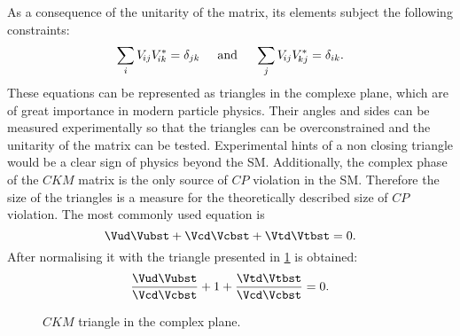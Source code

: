 As a consequence of the unitarity of the matrix, its elements subject the following constraints:
\begin{equation}
\sum_{i} V_{{\kern -0.1em}ij}V_{{\kern -0.1em}ik}^{*} = \delta_{jk}\hspace{0.5cm}\text{and}\hspace{0.5cm}
\sum_{j} V_{{\kern -0.1em}ij}V_{{\kern -0.1em}kj}^{*} = \delta_{ik}.
\end{equation}
These equations can be represented as triangles in the complexe plane, which are of great importance in modern particle physics.
Their angles and sides can be measured experimentally so that the triangles can be overconstrained and the unitarity of the matrix can be tested.
Experimental hints of a non closing triangle would be a clear sign of physics beyond the \ac{SM}.
Additionally, the complex phase of the $CKM$ matrix is the only source of $CP$ violation in the \ac{SM}.
Therefore the size of the triangles is a measure for the theoretically described size of $CP$ violation.
The most commonly used equation is
\begin{equation}
\Vud\Vubst + \Vcd\Vcbst + \Vtd\Vtbst = 0.
\end{equation}
After normalising it with \Vcd\Vcbst the triangle presented in \cref{fig:ckmtheory} is obtained:
\begin{equation}
\frac{\Vud\Vubst}{\Vcd\Vcbst} + 1 + \frac{\Vtd\Vtbst}{\Vcd\Vcbst} = 0. \label{eq:CKMtriangle}
\end{equation}
\begin{figure}[tbp]
	\centering
	
	\caption{$CKM$ triangle in the complex plane.}
	\label{fig:ckmtheory}
\end{figure}
